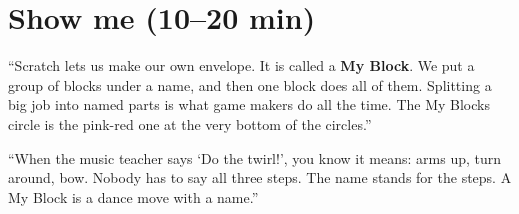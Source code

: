 \section{Show me (10--20 min)}
\begin{teacherscript}
\enquote{Scratch lets us make our own envelope. It is called a \textbf{My Block}. We put a group of blocks under a name, and then one block does all of them. Splitting a big job into named parts is what game makers do all the time. The My Blocks circle is the pink-red one at the very bottom of the circles.}
\end{teacherscript}

\begin{analogy}
\enquote{When the music teacher says \enquote{Do the twirl!}, you know it means: arms up, turn around, bow. Nobody has to say all three steps. The name stands for the steps. A My Block is a dance move with a name.}
\end{analogy}

